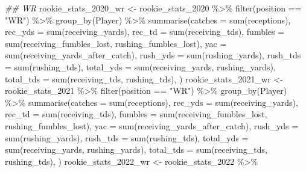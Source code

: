 \documentclass[
  letterpaper,
  DIV=11,
  numbers=noendperiod]{scrartcl}
\newenvironment{Shaded}{\begin{snugshade}}{\end{snugshade}}
\newcommand{\AttributeTok}[1]{\textcolor[rgb]{0.40,0.45,0.13}{#1}}
\newcommand{\DocumentationTok}[1]{\textcolor[rgb]{0.37,0.37,0.37}{\textit{#1}}}
\newcommand{\FunctionTok}[1]{\textcolor[rgb]{0.28,0.35,0.67}{#1}}
\newcommand{\NormalTok}[1]{\textcolor[rgb]{0.00,0.23,0.31}{#1}}
\newcommand{\OtherTok}[1]{\textcolor[rgb]{0.00,0.23,0.31}{#1}}
\newcommand{\SpecialCharTok}[1]{\textcolor[rgb]{0.37,0.37,0.37}{#1}}
\newcommand{\StringTok}[1]{\textcolor[rgb]{0.13,0.47,0.30}{#1}}
\begin{document}
\begin{Shaded}
\begin{Highlighting}[]
\DocumentationTok{\#\# WR}
\NormalTok{rookie\_stats\_2020\_wr }\OtherTok{\textless{}{-}}\NormalTok{ rookie\_stats\_2020 }\SpecialCharTok{\%\textgreater{}\%}
  \FunctionTok{filter}\NormalTok{(position }\SpecialCharTok{==} \StringTok{"WR"}\NormalTok{) }\SpecialCharTok{\%\textgreater{}\%}
  \FunctionTok{group\_by}\NormalTok{(Player) }\SpecialCharTok{\%\textgreater{}\%}
  \FunctionTok{summarise}\NormalTok{(}\AttributeTok{catches =} \FunctionTok{sum}\NormalTok{(receptions),}
            \AttributeTok{rec\_yds =} \FunctionTok{sum}\NormalTok{(receiving\_yards),}
            \AttributeTok{rec\_td =} \FunctionTok{sum}\NormalTok{(receiving\_tds),}
            \AttributeTok{fumbles =} \FunctionTok{sum}\NormalTok{(receiving\_fumbles\_lost, rushing\_fumbles\_lost),}
            \AttributeTok{yac =} \FunctionTok{sum}\NormalTok{(receiving\_yards\_after\_catch),}
            \AttributeTok{rush\_yds =} \FunctionTok{sum}\NormalTok{(rushing\_yards),}
            \AttributeTok{rush\_tds =} \FunctionTok{sum}\NormalTok{(rushing\_tds),}
            \AttributeTok{total\_yds =} \FunctionTok{sum}\NormalTok{(receiving\_yards, rushing\_yards),}
            \AttributeTok{total\_tds =} \FunctionTok{sum}\NormalTok{(receiving\_tds, rushing\_tds),}
\NormalTok{  )}
\NormalTok{rookie\_stats\_2021\_wr }\OtherTok{\textless{}{-}}\NormalTok{ rookie\_stats\_2021 }\SpecialCharTok{\%\textgreater{}\%}
  \FunctionTok{filter}\NormalTok{(position }\SpecialCharTok{==} \StringTok{"WR"}\NormalTok{) }\SpecialCharTok{\%\textgreater{}\%}
  \FunctionTok{group\_by}\NormalTok{(Player) }\SpecialCharTok{\%\textgreater{}\%}
  \FunctionTok{summarise}\NormalTok{(}\AttributeTok{catches =} \FunctionTok{sum}\NormalTok{(receptions),}
            \AttributeTok{rec\_yds =} \FunctionTok{sum}\NormalTok{(receiving\_yards),}
            \AttributeTok{rec\_td =} \FunctionTok{sum}\NormalTok{(receiving\_tds),}
            \AttributeTok{fumbles =} \FunctionTok{sum}\NormalTok{(receiving\_fumbles\_lost, rushing\_fumbles\_lost),}
            \AttributeTok{yac =} \FunctionTok{sum}\NormalTok{(receiving\_yards\_after\_catch),}
            \AttributeTok{rush\_yds =} \FunctionTok{sum}\NormalTok{(rushing\_yards),}
            \AttributeTok{rush\_tds =} \FunctionTok{sum}\NormalTok{(rushing\_tds),}
            \AttributeTok{total\_yds =} \FunctionTok{sum}\NormalTok{(receiving\_yards, rushing\_yards),}
            \AttributeTok{total\_tds =} \FunctionTok{sum}\NormalTok{(receiving\_tds, rushing\_tds),}
\NormalTok{  )}
\NormalTok{rookie\_stats\_2022\_wr }\OtherTok{\textless{}{-}}\NormalTok{ rookie\_stats\_2022 }\SpecialCharTok{\%\textgreater{}\%}

\end{Highlighting}
\end{Shaded}
\end{document}

